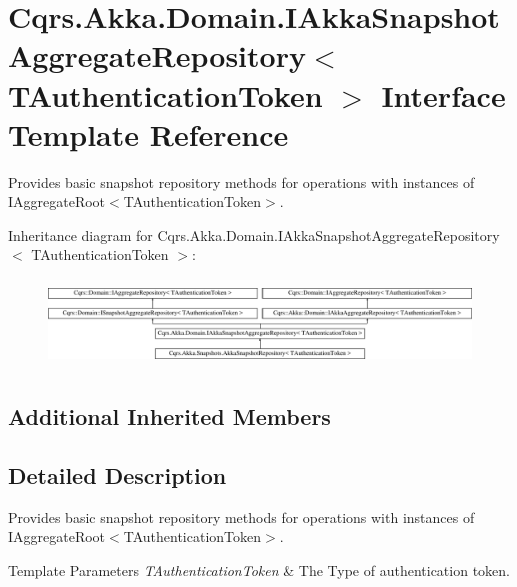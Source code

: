 \hypertarget{interfaceCqrs_1_1Akka_1_1Domain_1_1IAkkaSnapshotAggregateRepository}{}\section{Cqrs.\+Akka.\+Domain.\+I\+Akka\+Snapshot\+Aggregate\+Repository$<$ T\+Authentication\+Token $>$ Interface Template Reference}
\label{interfaceCqrs_1_1Akka_1_1Domain_1_1IAkkaSnapshotAggregateRepository}


Provides basic snapshot repository methods for operations with instances of I\+Aggregate\+Root$<$\+T\+Authentication\+Token$>$.  


Inheritance diagram for Cqrs.\+Akka.\+Domain.\+I\+Akka\+Snapshot\+Aggregate\+Repository$<$ T\+Authentication\+Token $>$\+:\begin{figure}[H]
\begin{center}
\leavevmode
\includegraphics[height=2.357895cm]{interfaceCqrs_1_1Akka_1_1Domain_1_1IAkkaSnapshotAggregateRepository}
\end{center}
\end{figure}
\subsection*{Additional Inherited Members}


\subsection{Detailed Description}
Provides basic snapshot repository methods for operations with instances of I\+Aggregate\+Root$<$\+T\+Authentication\+Token$>$. 


\begin{DoxyTemplParams}{Template Parameters}
{\em T\+Authentication\+Token} & The Type of authentication token.\\
\hline
\end{DoxyTemplParams}
